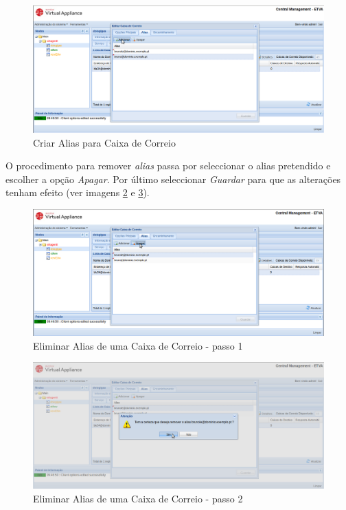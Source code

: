\begin{figure}[H]
    \begin{center}
    \includegraphics[scale=0.35]{screenshots/etms/etms_alias_create.png}
    \caption{Criar Alias para Caixa de Correio}
    \label{fig:etms_alias_create}
    \end{center}
\end{figure}

O procedimento para remover \textit{alias} passa por seleccionar o alias pretendido e escolher a opção \textit{Apagar}. Por último seleccionar \textit{Guardar} para que as alterações tenham efeito (ver imagens \ref{fig:etms_alias_mailbox_delete} e \ref{fig:etms_alias_mailbox_delete_2}).

\begin{figure}[H]
    \begin{center}
    \includegraphics[scale=0.35]{screenshots/etms/etms_alias_mailbox_delete.png}
    \caption{Eliminar Alias de uma Caixa de Correio - passo 1}
    \label{fig:etms_alias_mailbox_delete}
    \end{center}
\end{figure}

\begin{figure}[H]
    \begin{center}
    \includegraphics[scale=0.35]{screenshots/etms/etms_alias_mailbox_delete_2.png}
    \caption{Eliminar Alias de uma Caixa de Correio - passo 2}
    \label{fig:etms_alias_mailbox_delete_2}
    \end{center}
\end{figure}

